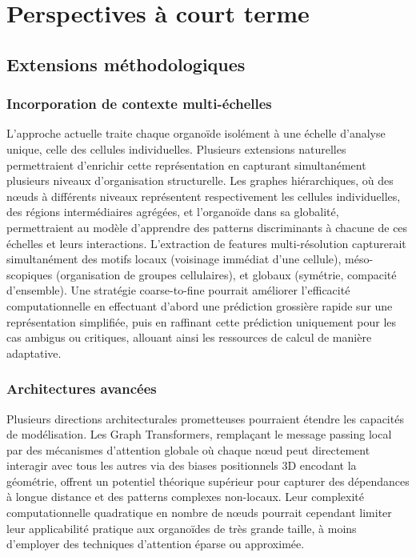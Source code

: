 \section{Perspectives à court terme}

\subsection{Extensions méthodologiques}

\subsubsection{Incorporation de contexte multi-échelles}

L'approche actuelle traite chaque organoïde isolément à une échelle d'analyse unique, celle des cellules individuelles. Plusieurs extensions naturelles permettraient d'enrichir cette représentation en capturant simultanément plusieurs niveaux d'organisation structurelle. Les graphes hiérarchiques, où des nœuds à différents niveaux représentent respectivement les cellules individuelles, des régions intermédiaires agrégées, et l'organoïde dans sa globalité, permettraient au modèle d'apprendre des patterns discriminants à chacune de ces échelles et leurs interactions. L'extraction de features multi-résolution capturerait simultanément des motifs locaux (voisinage immédiat d'une cellule), méso-scopiques (organisation de groupes cellulaires), et globaux (symétrie, compacité d'ensemble). Une stratégie coarse-to-fine pourrait améliorer l'efficacité computationnelle en effectuant d'abord une prédiction grossière rapide sur une représentation simplifiée, puis en raffinant cette prédiction uniquement pour les cas ambigus ou critiques, allouant ainsi les ressources de calcul de manière adaptative.

\subsubsection{Architectures avancées}

Plusieurs directions architecturales prometteuses pourraient étendre les capacités de modélisation. Les Graph Transformers, remplaçant le message passing local par des mécanismes d'attention globale où chaque nœud peut directement interagir avec tous les autres via des biases positionnels 3D encodant la géométrie, offrent un potentiel théorique supérieur pour capturer des dépendances à longue distance et des patterns complexes non-locaux. Leur complexité computationnelle quadratique en nombre de nœuds pourrait cependant limiter leur applicabilité pratique aux organoïdes de très grande taille, à moins d'employer des techniques d'attention éparse ou approximée.

